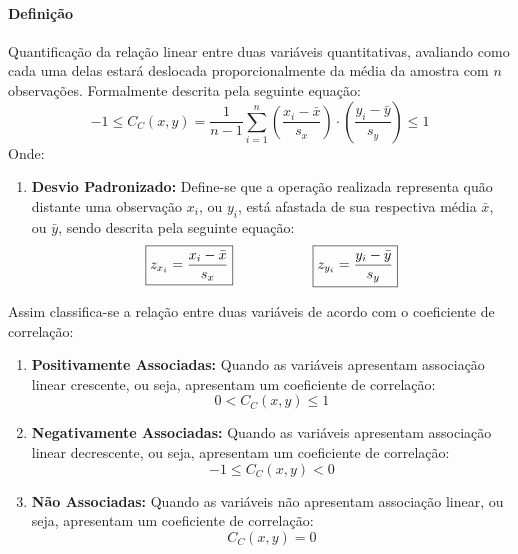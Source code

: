 \documentclass{article}
\begin{document}
            \paragraph{Definição}Quantificação da relação linear entre duas variáveis quantitativas, avaliando como cada uma delas estará deslocada proporcionalmente da média da amostra com $n$ observações. Formalmente descrita pela seguinte equação:
                \begin{equation}
                    \boxed{
                        -1 \le
                        C_{C}(x,y) = \frac{1}{n-1} \sum_{i=1}^{n} 
                        \left(\frac{x_{i}-\bar{x}}{s_{x}}\right)
                        \cdot
                        \left(\frac{y_{i}-\bar{y}}{s_{y}}\right)
                        \le 1
                    }
                \end{equation}
            Onde:
                \begin{enumerate}[rightmargin = \leftmargin, noitemsep]
                    \item \textbf{Desvio Padronizado:} Define-se que a operação realizada representa quão distante uma observação $x_{i}$, ou $y_{i}$, está afastada de sua respectiva média $\bar{x}$, ou $\bar{y}$, sendo descrita pela seguinte equação:
                        \begin{equation}
                            \boxed{
                                z_{x_{i}} = \frac{x_{i}-\bar{x}}{s_{x}}
                            }
                            \hspace{20mm}
                            \boxed{
                                z_{y_{i}} = \frac{y_{i}-\bar{y}}{s_{y}}
                            }
                        \end{equation}
                \end{enumerate}
            Assim classifica-se a relação entre duas variáveis de acordo com o coeficiente de correlação:
                \begin{enumerate}[rightmargin = \leftmargin, noitemsep]
                    \item \textbf{Positivamente Associadas:} Quando as variáveis apresentam associação linear crescente, ou seja, apresentam um coeficiente de correlação:
                        \[\boxed{0 < C_{C}(x,y) \le 1}\]
                    \item \textbf{Negativamente Associadas:} Quando as variáveis apresentam associação linear decrescente, ou seja, apresentam um coeficiente de correlação:
                        \[\boxed{-1 \le C_{C}(x,y) < 0}\]
                    \item \textbf{Não Associadas:} Quando as variáveis não apresentam associação linear, ou seja, apresentam um coeficiente de correlação:
                        \[\boxed{C_{C}(x,y) = 0}\]
                \end{enumerate}
\end{document}
